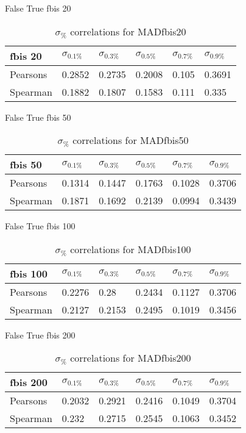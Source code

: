 \documentclass{sig-alternate}
\begin{document}
False True fbis 20
\begin{table}[h!]
\centering
\caption{$\sigma_{\%}$ correlations for MADfbis20}
\begin{tabular}{|l|l|l|l|l|l|}
\hline
fbis 20 & $\sigma_{0.1\%}$ & $\sigma_{0.3\%}$ & $\sigma_{0.5\%}$ & $\sigma_{0.7\%}$ & $\sigma_{0.9\%}$ \\ \hline
Pearsons  & 0.2852 & 0.2735 & 0.2008 & 0.105 & 0.3691 \\ \hline
Spearman  & 0.1882 & 0.1807 & 0.1583 & 0.111 & 0.335 \\ \hline
\end{tabular}
\end{table}
False True fbis 50
\begin{table}[h!]
\centering
\caption{$\sigma_{\%}$ correlations for MADfbis50}
\begin{tabular}{|l|l|l|l|l|l|}
\hline
fbis 50 & $\sigma_{0.1\%}$ & $\sigma_{0.3\%}$ & $\sigma_{0.5\%}$ & $\sigma_{0.7\%}$ & $\sigma_{0.9\%}$ \\ \hline
Pearsons  & 0.1314 & 0.1447 & 0.1763 & 0.1028 & 0.3706 \\ \hline
Spearman  & 0.1871 & 0.1692 & 0.2139 & 0.0994 & 0.3439 \\ \hline
\end{tabular}
\end{table}
False True fbis 100
\begin{table}[h!]
\centering
\caption{$\sigma_{\%}$ correlations for MADfbis100}
\begin{tabular}{|l|l|l|l|l|l|}
\hline
fbis 100 & $\sigma_{0.1\%}$ & $\sigma_{0.3\%}$ & $\sigma_{0.5\%}$ & $\sigma_{0.7\%}$ & $\sigma_{0.9\%}$ \\ \hline
Pearsons  & 0.2276 & 0.28 & 0.2434 & 0.1127 & 0.3706 \\ \hline
Spearman  & 0.2127 & 0.2153 & 0.2495 & 0.1019 & 0.3456 \\ \hline
\end{tabular}
\end{table}
False True fbis 200
\begin{table}[h!]
\centering
\caption{$\sigma_{\%}$ correlations for MADfbis200}
\begin{tabular}{|l|l|l|l|l|l|}
\hline
fbis 200 & $\sigma_{0.1\%}$ & $\sigma_{0.3\%}$ & $\sigma_{0.5\%}$ & $\sigma_{0.7\%}$ & $\sigma_{0.9\%}$ \\ \hline
Pearsons  & 0.2032 & 0.2921 & 0.2416 & 0.1049 & 0.3704 \\ \hline
Spearman  & 0.232 & 0.2715 & 0.2545 & 0.1063 & 0.3452 \\ \hline
\end{tabular}
\end{table}
\end{document}
